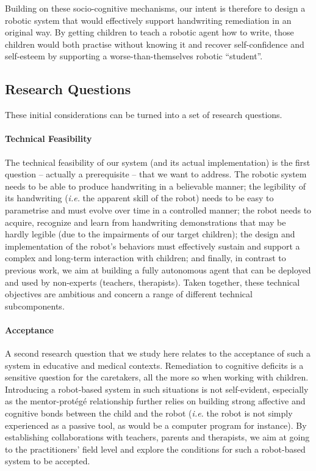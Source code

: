 \documentclass{article}
\newcommand{\ie}{\textit{i.e.}\xspace}
\begin{document}
Building on these socio-cognitive mechanisms, our intent is therefore to design
a robotic system that would effectively support handwriting remediation in an
original way. By getting children to teach a robotic agent how to write, those
children would both practise without knowing it and recover self-confidence and
self-esteem by supporting a worse-than-themselves robotic ``student''.

\subsection{Research Questions}

These initial considerations can be turned into a set of research questions.

\paragraph{Technical Feasibility} The technical feasibility of our system (and
its actual implementation) is the first question -- actually a prerequisite --
that we want to address. The robotic system needs to be able to produce
handwriting in a believable manner; the legibility of its handwriting (\ie the
apparent skill of the robot) needs to be easy to parametrise and must evolve
over time in a controlled manner; the robot needs to acquire, recognize and
learn from handwriting demonstrations that may be hardly legible (due to the
impairments of our target children); the design and implementation of the
robot's behaviors must effectively sustain and support a complex and long-term
interaction with children; and finally, in contrast to previous work, we aim at
building a fully autonomous agent that can be deployed and used by non-experts
(teachers, therapists). Taken together, these technical objectives are
ambitious and concern a range of different technical subcomponents.

\paragraph{Acceptance} A second research question that we study here relates to
the acceptance of such a system in educative and medical contexts. Remediation
to cognitive deficits is a sensitive question for the caretakers, all the more
so when working with children. Introducing a robot-based system in such
situations is not self-evident, especially as the mentor-protégé relationship
further relies on building strong affective and cognitive bonds between the
child and the robot (\ie the robot is not simply experienced as a passive tool,
as would be a computer program for instance). By establishing collaborations
with teachers, parents and therapists, we aim at going to the practitioners'
field level and explore the conditions for such a robot-based system to be
accepted.
\end{document}
